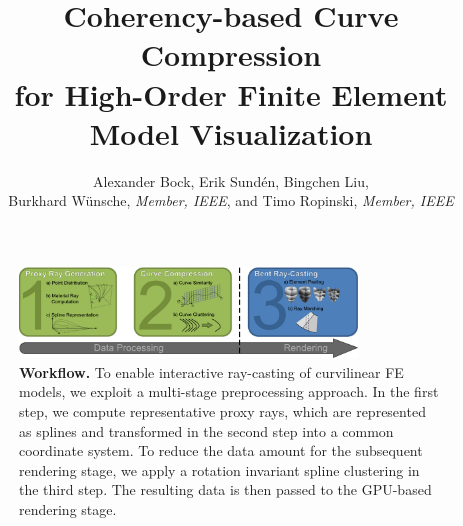 \documentclass[journal]{vgtc}                %
\title{Coherency-based Curve Compression\\ for High-Order Finite Element Model Visualization}
\author{Alexander Bock, Erik Sund\'en, Bingchen Liu,\\Burkhard W{\"u}nsche, \textit{Member, IEEE}, and Timo Ropinski, \textit{Member, IEEE}}
\begin{document}
%
%
\label{sec:introduction}
%
\maketitle
%
\begin{figure}[t]
    \centering
    \includegraphics[width=0.8\textwidth]{figures/workflow-new.pdf}
    \caption{\textbf{Workflow.} To enable interactive ray-casting of curvilinear FE models, we exploit a multi-stage preprocessing approach. In the first step, we compute representative proxy rays, which are represented as splines and transformed in the second step into a common coordinate system. To reduce the data amount for the subsequent rendering stage, we apply a rotation invariant spline clustering in the third step. The resulting data is then passed to the GPU-based rendering stage.}
    \label{fig:workflow}
\end{figure}
%
%
%
\end{document}
